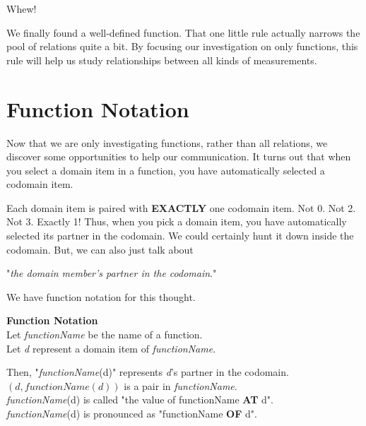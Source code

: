 \documentclass{ximera}
\begin{document}
Whew!  

We finally found a well-defined function. That one little rule actually narrows the pool of relations quite a bit.  By focusing our investigation on only functions, this rule will help us study relationships between all kinds of measurements. \\












\section{Function Notation}

Now that we are only investigating functions, rather than all relations, we discover some opportunities to help our communication.  It turns out that when you select a domain item in a function, you have automatically selected a codomain item.

Each domain item is paired with \textbf{\textcolor{purple!85!blue}{EXACTLY}} one codomain item.  Not 0. Not 2.  Not 3.  Exactly 1!  Thus, when you pick a domain item, you have automatically selected its partner in the codomain.  We could certainly hunt it down inside the codomain.  But, we can also just talk about 


\begin{center}
"\textit{the domain member's partner in the codomain}."  
\end{center}



We have function notation for this thought. \\

\begin{notation} \textbf{\textcolor{green!50!black}{Function Notation}}  \\

Let \textit{functionName} be the name of a function. \\
Let \textit{d} represent a domain item of \textit{functionName}.

Then, "\textit{functionName}(d)" represents \textit{d}'s partner in the codomain. \\

$(d, functionName(d))$ is a pair in \textit{functionName}. \\


\textit{functionName}(d) is called "the value of functionName \textbf{\textcolor{purple!85!blue}{AT}} d". \\
\textit{functionName}(d) is pronounced as "functionName \textbf{\textcolor{purple!85!blue}{OF}} d".
\end{notation}
\end{document}
